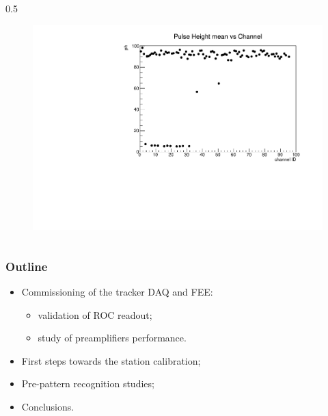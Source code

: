 \documentclass{beamer}
\begin{document}
\begin{frame}
\begin{columns}
\begin{column}{0.5\framewidth}
\begin{figure}[!h]
      \includegraphics[width=1.\columnwidth]{figures/pdf/ph_vs_ch1.pdf}
     \label{fig:normalhits}
\end{figure}
\end{column}
\end{columns}
\end{frame}



\begin{frame}
    \frametitle{Outline}
    
\begin{itemize}
\item \textcolor{mygray}{Commissioning of the tracker DAQ and FEE:}
\begin{itemize}
         \vspace{2mm}

    \item \textcolor{mygray}{validation of ROC readout;}
             \vspace{1.5mm}

    \item \textcolor{mygray}{study of preamplifiers performance}.
\end{itemize}
\vspace{4mm}
    \item First steps towards the station calibration;
    \vspace{6mm}

    \item \textcolor{mygray}{Pre-pattern recognition studies;}
  \vspace{6mm}
    \item \textcolor{mygray}{Conclusions.}
\end{itemize}
\end{frame}
\end{document}
